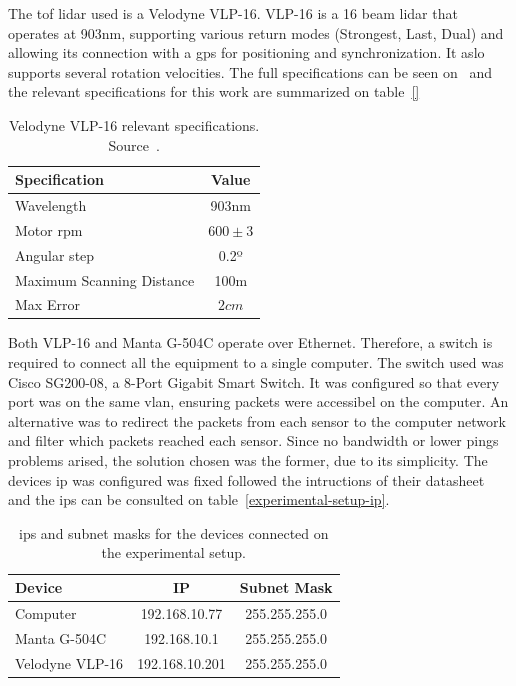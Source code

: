
The \ac{tof} \ac{lidar} used is a Velodyne VLP-16\texttrademark. VLP-16 is a 16 beam \ac{lidar} that operates at 903nm, supporting various return modes (Strongest, Last, Dual) and allowing its connection with a \ac{gps} for positioning and synchronization. It aslo supports several rotation velocities. The full specifications can be seen on~\cite{VLP16} and the relevant specifications for this work are summarized on table~\ref{}

\begin{table}[H]
	\renewcommand{\arraystretch}{1.2}
	\centering
	\begin{tabular}{@{}lc@{}}
		\toprule
		Specification & Value \\ \midrule
		Wavelength    & 903nm \\
		Motor \ac{rpm} & $600 \pm 3$ \\
		Angular step & 0.2º \\
		Maximum Scanning Distance & 100m \\
		Max Error & $2 cm$ \\
		\bottomrule
	\end{tabular}
	\caption{Velodyne VLP-16 relevant specifications. Source~\cite{VLP16}.}
	\label{tab:vlp16-soecs}
\end{table}

Both VLP-16 and Manta G-504C operate over Ethernet. Therefore, a switch is required to connect all the equipment to a single computer. The switch used was Cisco SG200-08, a 8-Port Gigabit Smart Switch. It was configured so that every port was on the same \ac{vlan}, ensuring packets were accessibel on the computer. An alternative was to redirect the packets from each sensor to the computer network and filter which packets reached each sensor. Since no bandwidth or lower pings problems arised, the solution chosen was the former, due to its simplicity. The devices \ac{ip} was configured was fixed followed the intructions of their datasheet~\cite{VLP16} and the \acp{ip} can be consulted on table~\ref{experimental-setup-ip}.

\begin{table}[H]
	\renewcommand{\arraystretch}{1.2}
	\centering
	\begin{tabular}{@{}lcc@{}}
		\toprule
		Device          & \ac{IP} & Subnet Mask\\ \midrule
		Computer        & 192.168.10.77  & 255.255.255.0 \\
		Manta G-504C    & 192.168.10.1   & 255.255.255.0 \\
		Velodyne VLP-16 & 192.168.10.201 & 255.255.255.0 \\
		\bottomrule
	\end{tabular}
	\label{tab:experimental-setup-ip}
	\caption{\acp{ip} and subnet masks for the devices connected on the experimental setup.}
\end{table}

